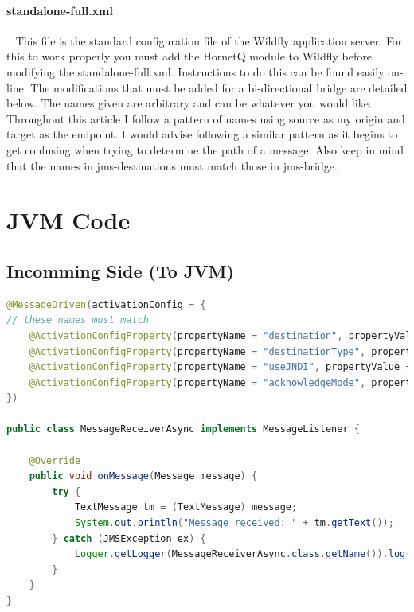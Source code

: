 \documentclass[
10pt, %
letterpaper, %
oneside, %
headinclude,footinclude, %
BCOR5mm, %
]{scrartcl}
\begin{document}
\paragraph{standalone-full.xml} ~\newline\newline
This file is the standard configuration file of the Wildfly application server. For this to work properly you must add the HornetQ module to Wildfly before modifying the standalone-full.xml. Instructions to do this can be found easily on-line. The modifications that must be added for a bi-directional bridge are detailed below. The names given are arbitrary and can be whatever you would like. Throughout this article I follow a pattern of names using source as my origin and target as the endpoint. I would advise following a similar pattern as it begins to get confusing when trying to determine the path of a message. Also keep in mind that the names in jms-destinations must match those in jms-bridge.\newline


\section{JVM Code}


\subsection {\textbf{Incomming Side (To JVM)}}

\begin{lstlisting}[language=Java]
@MessageDriven(activationConfig = {
// these names must match
    @ActivationConfigProperty(propertyName = "destination", propertyValue = "java:jboss/exported/jms/queue/AMQTargetQ"),
    @ActivationConfigProperty(propertyName = "destinationType", propertyValue = "javax.jms.Queue"),
    @ActivationConfigProperty(propertyName = "useJNDI", propertyValue = "true"),
    @ActivationConfigProperty(propertyName = "acknowledgeMode", propertyValue = "Auto-acknowledge")
})

public class MessageReceiverAsync implements MessageListener {

    @Override
    public void onMessage(Message message) {
        try {
            TextMessage tm = (TextMessage) message;
            System.out.println("Message received: " + tm.getText());
        } catch (JMSException ex) {
            Logger.getLogger(MessageReceiverAsync.class.getName()).log(Level.SEVERE, null, ex);
        }
    }
}
\end{lstlisting}
\end{document}
